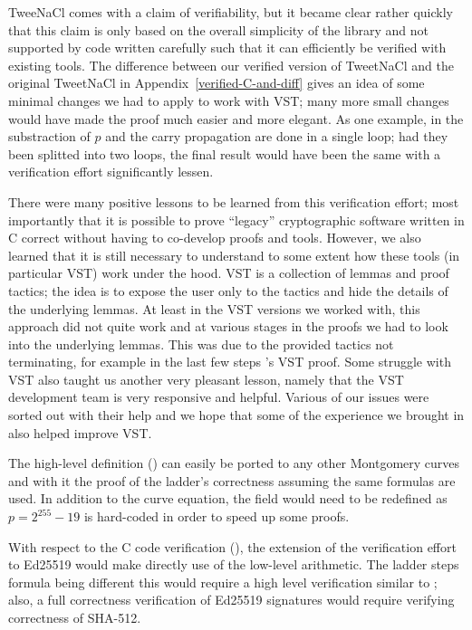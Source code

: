 TweeNaCl comes with a claim of verifiability, but it became clear
rather quickly that this claim is only based on the overall simplicity
of the library and not supported by code written carefully such that it can
efficiently be verified with existing tools. The difference between
our verified version of TweetNaCl and the original TweetNaCl in
Appendix~\ref{verified-C-and-diff} gives an idea of some minimal
changes we had to apply to work with VST; many more small changes
would have made the proof much easier and more elegant. As one
example, in  the substraction of $p$ and the carry
propagation are done in a single  loop;
had they been splitted into two loops, the final result would have been the same with a
verification effort significantly lessen.

There were many positive lessons to be learned from this verification effort;
most importantly that it is possible to prove ``legacy'' cryptographic
software written in C correct without having to co-develop proofs
and tools. However, we also learned that it is still necessary to
understand to some extent how these tools (in particular VST)
work under the hood.
VST is a collection of lemmas and proof tactics; the idea is
to expose the user only to the tactics and hide the details of
the underlying lemmas.
At least in the VST versions we worked with,
this approach did not quite work and at various stages in
the proofs we had to look into the underlying lemmas.
This was due to the provided tactics not terminating,
for example in the last few steps 's VST proof.
Some struggle with VST also taught us another very pleasant lesson,
namely that the VST development team is very responsive and helpful.
Various of our issues were sorted out with their help and we hope
that some of the experience we brought in also helped improve VST.

The high-level definition () can easily be ported to any
other Montgomery curves and with it the proof of the ladder's correctness
assuming the same formulas are used.
In addition to the curve equation, the field  would need to be redefined
as $p=2^{255}-19$ is hard-coded in order to speed up some proofs.

With respect to the C code verification (), the extension of
the verification effort to Ed25519 would make directly use of the low-level
arithmetic. The ladder steps formula being different this would require a high
level verification similar to ;
also, a full correctness verification of Ed25519 signatures would require
verifying correctness of SHA-512.

